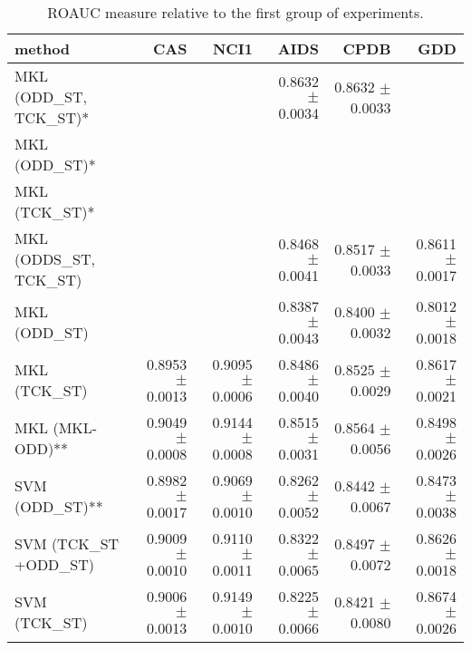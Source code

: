 \begin{landscape}
    \begin{table}[ht]
        \centering
        \begin{tabular}{|l|r|r|r|r|r|}
            \hline
            method&CAS&NCI1&AIDS&CPDB&GDD\\
            \hline
            MKL (ODD\_ST, TCK\_ST)* &&&0.8632 $\pm$ 0.0034&0.8632 $\pm$ 0.0033&\\
            \hline
            MKL (ODD\_ST)*&&&&&\\
            \hline
            MKL (TCK\_ST)*&&&&&\\
            \hline
            MKL (ODDS\_ST, TCK\_ST)&&&0.8468 $\pm$ 0.0041&0.8517 $\pm$ 0.0033&0.8611 $\pm$ 0.0017\\
            \hline
            MKL (ODD\_ST)&&&0.8387 $\pm$ 0.0043&0.8400 $\pm$ 0.0032&0.8012$\pm$ 0.0018\\
            \hline
            MKL (TCK\_ST)&0.8953 $\pm$ 0.0013&0.9095 $\pm$ 0.0006&0.8486 $\pm$ 0.0040&0.8525 $\pm$ 0.0029&0.8617 $\pm$ 0.0021\\
            \hline
            MKL (MKL-ODD)** &0.9049 $\pm$ 0.0008&0.9144 $\pm$ 0.0008&0.8515 $\pm$ 0.0031&0.8564 $\pm$ 0.0056&0.8498 $\pm$ 0.0026\\
            \hline
            SVM (ODD\_ST)** &0.8982 $\pm$ 0.0017&0.9069 $\pm$ 0.0010&0.8262 $\pm$ 0.0052&0.8442 $\pm$ 0.0067&0.8473 $\pm$ 0.0038\\
            \hline
            SVM (TCK\_ST +ODD\_ST)&0.9009 $\pm$ 0.0010&0.9110 $\pm$ 0.0011&0.8322 $\pm$ 0.0065&0.8497 $\pm$ 0.0072&0.8626 $\pm$ 0.0018\\
            \hline
            SVM (TCK\_ST)&0.9006 $\pm$ 0.0013&0.9149 $\pm$ 0.0010&0.8225 $\pm$ 0.0066&0.8421 $\pm$ 0.0080&0.8674 $\pm$ 0.0026\\
            \hline
        \end{tabular}
        \label{table:results_st}
        \caption{ROAUC measure relative to the first group of experiments.}


\end{table}
\end{landscape}
